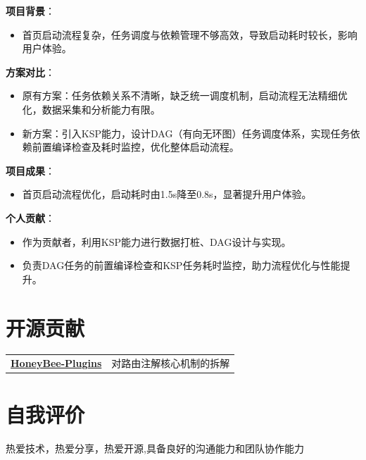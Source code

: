 \documentclass[]{deedy-resume-openfont}
\begin{document}
\begin{minipage}[t]{0.75\textwidth}
\vspace{0.1em}
\vspace{0.1em}
\begin{tightemize}
    \item \textbf{项目背景}：
        \begin{itemize}
            \item 首页启动流程复杂，任务调度与依赖管理不够高效，导致启动耗时较长，影响用户体验。
        \end{itemize}
    \item \textbf{方案对比}：
        \begin{itemize}
            \item 原有方案：任务依赖关系不清晰，缺乏统一调度机制，启动流程无法精细优化，数据采集和分析能力有限。
            \item 新方案：引入KSP能力，设计DAG（有向无环图）任务调度体系，实现任务依赖前置编译检查及耗时监控，优化整体启动流程。
        \end{itemize}
    \item \textbf{项目成果}：
        \begin{itemize}
            \item 首页启动流程优化，启动耗时由1.5s降至0.8s，显著提升用户体验。
        \end{itemize}
    \item \textbf{个人贡献}：
        \begin{itemize}
            \item 作为贡献者，利用KSP能力进行数据打桩、DAG设计与实现。
            \item 负责DAG任务的前置编译检查和KSP任务耗时监控，助力流程优化与性能提升。
        \end{itemize}
\end{tightemize}
\sectionsep

\section{开源贡献}
\begin{tabular}{ll}
\href{https://github.com/Catheryan/HoneyBee-Plugins}{\bf HoneyBee-Plugins} & 对路由注解核心机制的拆解 \\
\end{tabular}
\sectionsep

\section{自我评价}
\sectionsep
\begin{tightemize}
    \item 热爱技术，热爱分享，热爱开源,具备良好的沟通能力和团队协作能力
\end{tightemize}    
\end{minipage}
\end{document}
